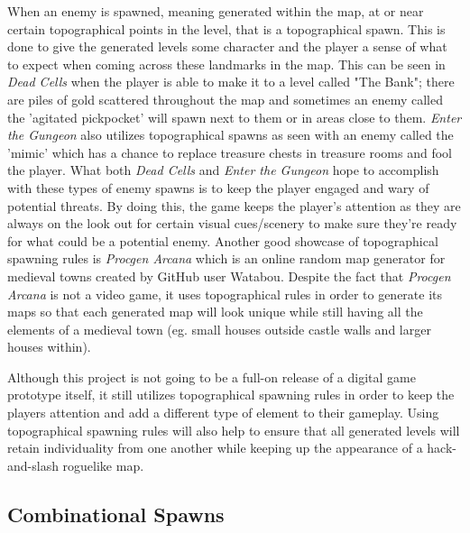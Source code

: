 \documentclass[10pt,twocolumn]{article}
\begin{document}
When an enemy is spawned, meaning generated within the map, at or near certain topographical points in the level, that is a topographical spawn. This is done to give the generated levels some character and the player a sense of what to expect when coming across these landmarks in the map. This can be seen in \textit{Dead Cells} when the player is able to make it to a level called "The Bank"; there are piles of gold scattered throughout the map and sometimes an enemy called the 'agitated pickpocket' will spawn next to them or in areas close to them. \textit{Enter the Gungeon}\cite{enterthegungeon} also utilizes topographical spawns as seen with an enemy called the 'mimic' which has a chance to replace treasure chests in treasure rooms and fool the player. What both \textit{Dead Cells} and \textit{Enter the Gungeon} hope to accomplish with these types of enemy spawns is to keep the player engaged and wary of potential threats. By doing this, the game keeps the player's attention as they are always on the look out for certain visual cues/scenery to make sure they're ready for what could be a potential enemy. Another good showcase of topographical spawning rules is \textit{Procgen Arcana}\cite{procgenarcana} which is an online random map generator for medieval towns created by GitHub user Watabou. Despite the fact that \textit{Procgen Arcana} is not a video game, it uses topographical rules in order to generate its maps so that each generated map will look unique while still having all the elements of a medieval town (eg. small houses outside castle walls and larger houses within). 

Although this project is not going to be a full-on release of a digital game prototype itself, it still utilizes topographical spawning rules in order to keep the players attention and add a different type of element to their gameplay. Using topographical spawning rules will also help to ensure that all generated levels will retain individuality from one another while keeping up the appearance of a hack-and-slash roguelike map. 

\subsection{Combinational Spawns}
\end{document}
